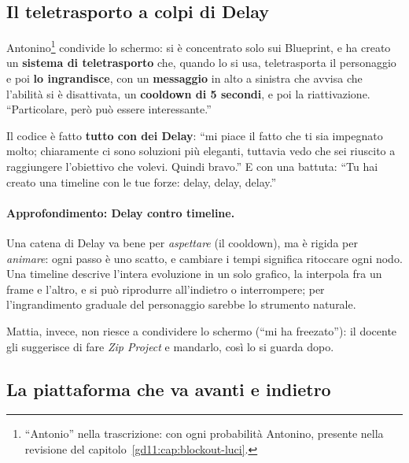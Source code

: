 \subsection{Il teletrasporto a colpi di Delay}

Antonino\footnote{``Antonio'' nella trascrizione: con ogni probabilità
Antonino, presente nella revisione del capitolo~\ref{gd11:cap:blockout-luci}.}
condivide lo schermo: si è concentrato solo sui Blueprint, e ha creato un
\textbf{sistema di teletrasporto} che, quando lo si usa, teletrasporta il
personaggio e poi \textbf{lo ingrandisce}, con un \textbf{messaggio} in alto a
sinistra che avvisa che l'abilità si è disattivata, un \textbf{cooldown di 5
secondi}, e poi la riattivazione. ``Particolare, però può essere
interessante.''

Il codice è fatto \textbf{tutto con dei Delay}: ``mi piace il fatto che ti sia
impegnato molto; chiaramente ci sono soluzioni più eleganti, tuttavia vedo che
sei riuscito a raggiungere l'obiettivo che volevi. Quindi bravo.'' E con una
battuta: ``Tu hai creato una timeline con le tue forze: delay, delay, delay.''

\paragraph{Approfondimento: Delay contro timeline.} Una catena di Delay va
bene per \emph{aspettare} (il cooldown), ma è rigida per \emph{animare}: ogni
passo è uno scatto, e cambiare i tempi significa ritoccare ogni nodo. Una
timeline descrive l'intera evoluzione in un solo grafico, la interpola fra un
frame e l'altro, e si può riprodurre all'indietro o interrompere; per
l'ingrandimento graduale del personaggio sarebbe lo strumento naturale.

Mattia, invece, non riesce a condividere lo schermo (``mi ha freezato''): il
docente gli suggerisce di fare \emph{Zip Project} e mandarlo, così lo si guarda
dopo.

\subsection{La piattaforma che va avanti e indietro}

